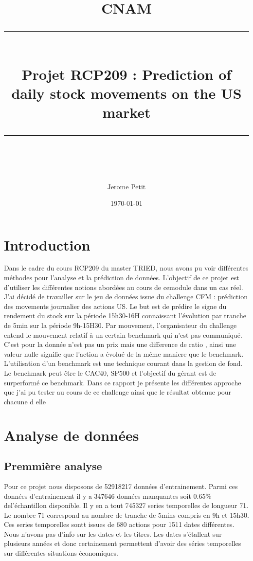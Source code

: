 \documentclass[11pt]{scrartcl} %
\title{	
	\normalfont\normalsize
	\textsc{CNAM}\\ %
	\vspace{25pt} %
	\rule{\linewidth}{0.5pt}\\ %
	\vspace{20pt} %
	{\huge Projet RCP209 : Prediction of daily stock movements on the US market }\\ %
	\vspace{12pt} %
	\rule{\linewidth}{2pt}\\ %
	\vspace{12pt} %
}
\author{\LARGE Jerome Petit} %
\date{\normalsize\today} %
\begin{document}
\maketitle %


\section{Introduction}
Dans le cadre du cours RCP209 du master TRIED, nous avons pu voir différentes m\'{e}thodes pour  l'analyse et la pr\'{e}diction de donn\'{e}es. L'objectif de ce projet est d'utiliser les diff\'{e}rentes notions abord\'{e}es au cours de cemodule dans un cas r\'{e}el. J'ai d\'{e}cid\'{e} de travailler sur le jeu de donn\'{e}es issue du challenge CFM : pr\'{e}diction des movements journalier des actions US. Le but est de pr\'{e}dire le signe du rendement du stock sur la p\'{e}riode 15h30-16H connaissant l'\'{e}volution par tranche de 5min sur la p\'{e}riode 9h-15H30. Par mouvement, l'organisateur du challenge entend le mouvement relatif \`{a} un certain benchmark qui n'est pas communiqu\'{e}. C'est pour la donn\'{e}e n'est pas un prix mais une difference de ratio , ainsi une valeur nulle signifie que l'action a \'{e}volu\'{e} de la même maniere que le benchmark. L'utilisation d'un benchmark est une technique courant dans la gestion de fond. Le benchmark peut être le CAC40, SP500 et l'objectif du g\'{e}rant est de surperform\'{e} ce benchmark.\newline
Dans ce rapport je pr\'{e}sente les diff\'{e}rentes approche que j'ai pu tester au cours de ce challenge ainsi que le r\'{e}sultat obtenue pour chacune d elle
\section{Analyse de données}
\subsection{Premmière analyse}
Pour ce projet nous disposons de 52918217 données d'entrainement. Parmi ces données d'entrainement il y a 347646 données manquantes soit 0.65\% del'échantillon disponible. Il y en a tout 745327 series temporelles de longueur 71. Le nombre 71 correspond au nombre de tranche de 5mins compris en 9h et 15h30. Ces series temporelles sontt issues de 680 actions pour 1511 dates différentes. Nous n'avons pas d'info sur les dates et les titres. Les dates s'étallent sur plusieurs années et donc certainement permettent d'avoir des séries temporelles sur différentes situations économiques.
\end{document}

